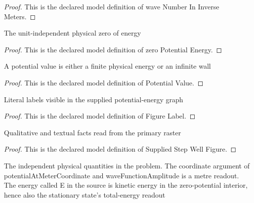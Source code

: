 \begin{proof}
  This is the declared model definition of wave Number In Inverse Meters.
\end{proof}
\begin{definition}
  \label{def:physics:phyx-mini-0521:phyxminiproblems-problemphyxmini0521-zeropotentialenergy}
  The unit-independent physical zero of energy
\end{definition}
\begin{proof}
  This is the declared model definition of zero Potential Energy.
\end{proof}
\begin{definition}
  \label{def:physics:phyx-mini-0521:phyxminiproblems-problemphyxmini0521-potentialvalue}
  A potential value is either a finite physical energy or an infinite wall
\end{definition}
\begin{proof}
  This is the declared model definition of Potential Value.
\end{proof}
\begin{definition}
  \label{def:physics:phyx-mini-0521:phyxminiproblems-problemphyxmini0521-figurelabel}
  Literal labels visible in the supplied potential-energy graph
\end{definition}
\begin{proof}
  This is the declared model definition of Figure Label.
\end{proof}
\begin{definition}
  \label{def:physics:phyx-mini-0521:phyxminiproblems-problemphyxmini0521-suppliedstepwellfigure}
  Qualitative and textual facts read from the primary raster
\end{definition}
\begin{proof}
  This is the declared model definition of Supplied Step Well Figure.
\end{proof}
\begin{definition}
  \label{def:physics:phyx-mini-0521:phyxminiproblems-problemphyxmini0521-finitestepwellsetup}
  The independent physical quantities in the problem. The coordinate argument of potentialAtMeterCoordinate and waveFunctionAmplitude is a metre readout. The energy called E in the source is kinetic energy in the zero-potential interior, hence also the stationary state's total-energy readout
\end{definition}
